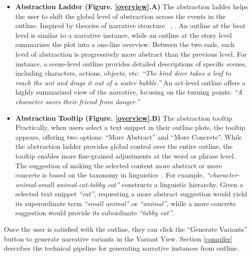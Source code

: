 \begin{itemize}
    \item \textbf{Abstraction Ladder (Figure. \ref{overview}.A)} The abstraction ladder helps the user to shift the global level of abstraction across the events in the outline. Inspired by theories of narrative structure ~\cite{styan1960elements, mckee1997story}, . An outline at the beat level is similar to a narrative instance, while an outline at the story level summarizes the plot into a one-line overview. Between the two ends, each level of abstraction is progressively more abstract than the previous level. For instance, a scene-level outline provides detailed descriptions of specific scenes, including characters, actions, objects, etc: \textit{``The kind dove takes a leaf to reach the ant and drags it out of a water bubble.''} An act-level outline offers a highly summarized view of the narrative, focusing on the turning points: \textit{``A character saves their friend from danger.''}
    \item \textbf{Abstraction Tooltip (Figure. \ref{overview}.B)} The abstraction tooltip  Practically, when users select a text snippet in their outline plots, the tooltip appears, offering two options: ``More Abstract'' and ``More Concrete''.  While the abstraction ladder provides global control over the entire outline, the tooltip enables more fine-grained adjustments at the word or phrase level. The suggestion of making the selected content more abstract or more concrete is based on the taxonomy in linguistics~\cite{hayes1983cognitive}. For example, {\it ``character-animal-small animal-cat-tabby cat''} constructs a linguistic hierarchy. Given a selected text snippet {\it ``cat''}, requesting a more abstract suggestion would yield its superordinate term {\it ``small animal''} or {\it ``animal''}, while a more concrete suggestion would provide its subordinate {\it ``tabby cat''}. 
\end{itemize}
Once the user is satisfied with the outline, they can click the ``Generate Variants'' button to generate narrative variants in the Variant View. Section \ref{compiler} describes the technical pipeline for generating narrative instances from outline. 

